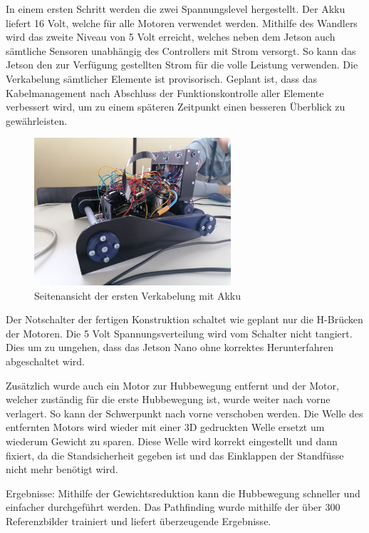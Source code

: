   
  In einem ersten Schritt werden die zwei Spannungslevel hergestellt. Der Akku liefert 16 Volt, welche für alle Motoren verwendet werden. Mithilfe des Wandlers wird das zweite Niveau von 5 Volt erreicht, welches neben dem Jetson auch sämtliche Sensoren unabhängig des Controllers mit Strom versorgt. So kann das Jetson den zur Verfügung gestellten Strom für die volle Leistung verwenden.
  Die Verkabelung sämtlicher Elemente ist provisorisch. Geplant ist, dass das Kabelmanagement nach Abschluss der Funktionskontrolle aller Elemente verbessert wird, um zu einem späteren Zeitpunkt einen besseren Überblick zu gewährleisten.
  
   \begin{figure}[H]
  \includegraphics[width=0.65\textwidth]{img/Sprint3/Sprint3_Verkabelung2.jpg}
  \centering
  \caption{Seitenansicht der ersten Verkabelung mit Akku}
  \label{fig:Seitenansicht der ersten Verkabelung}
  \end{figure}
  
  Der Notschalter der fertigen Konstruktion schaltet wie geplant nur die H-Brücken der Motoren. Die 5 Volt Spannungsverteilung wird vom Schalter nicht tangiert. Dies um zu umgehen, dass das Jetson Nano ohne korrektes Herunterfahren abgeschaltet wird.
  
  Zusätzlich wurde auch ein Motor zur Hubbewegung entfernt und der Motor, welcher zuständig für die erste Hubbewegung ist, wurde weiter nach vorne verlagert. So kann der Schwerpunkt nach vorne verschoben werden.
Die Welle des entfernten Motors wird wieder mit einer 3D gedruckten Welle ersetzt um wiederum Gewicht zu sparen. Diese Welle wird korrekt eingestellt und dann fixiert, da die Standsicherheit gegeben ist und das Einklappen der Standfüsse nicht mehr benötigt wird.
  
Ergebnisse: Mithilfe der Gewichtsreduktion kann die Hubbewegung schneller und einfacher durchgeführt werden. Das Pathfinding wurde mithilfe der über 300 Referenzbilder trainiert und liefert überzeugende Ergebnisse.
 
